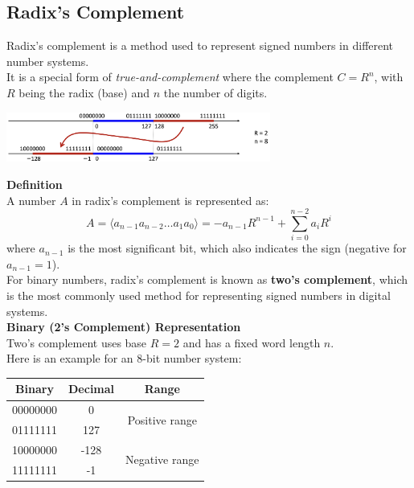 \subsection{Radix's Complement}
Radix's complement is a method used to represent signed numbers in different number systems. \\
It is a special form of \textit{true-and-complement} where the complement $C = R^n$, with $R$ being the radix (base) and $n$ the number of digits. \\
\vspace*{5px}
\begin{center}
    \includegraphics[width=0.65\textwidth]{chapters/chapter1e/images/twoscomplement.png}
\end{center}
\textbf{Definition} \\
\vspace*{2px}
A number $A$ in radix's complement is represented as:
\[
A = \langle a_{n-1}a_{n-2}\dots a_1a_0 \rangle = -a_{n-1}R^{n-1} + \sum_{i=0}^{n-2} a_i R^i
\]
where $a_{n-1}$ is the most significant bit, which also indicates the sign (negative for $a_{n-1} = 1$). \\
\vspace*{5px}
For binary numbers, radix’s complement is known as \textbf{two's complement}, which is the most commonly used method for representing signed numbers in digital systems. \\
\vspace*{5px}
\textbf{Binary (2's Complement) Representation} \\
\vspace*{2px}
Two's complement uses base $R = 2$ and has a fixed word length $n$. \\
Here is an example for an 8-bit number system:



\begin{center}
\begin{tabular}{|c|c|c|}
\hline
\textbf{Binary} & \textbf{Decimal} & \textbf{Range} \\
\hline
00000000 & 0   & \multirow{2}{*}{Positive range} \\
01111111 & 127 & \\
\hline
10000000 & -128 & \multirow{2}{*}{Negative range} \\
11111111 & -1   & \\
\hline
\end{tabular}
\end{center}

